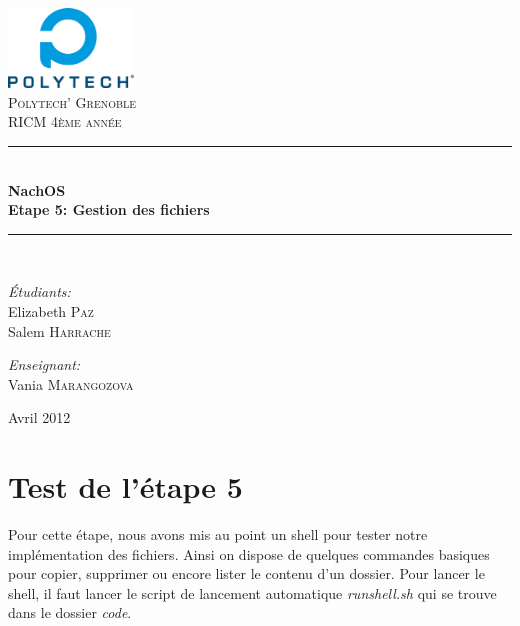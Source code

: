 \documentclass[a4paper,10pt]{article}
\newcommand{\HRule}{\rule{\linewidth}{0.6mm}}
\begin{document}
\begin{titlepage}

\begin{center}


\includegraphics[width=0.25\textwidth]{../images/logo}\\[1cm]

\textsc{\LARGE Polytech' Grenoble}\\[1.5cm]

\textsc{\Large RICM 4\`eme ann\'ee}\\[1.2cm]


\HRule \\[0.4cm]
{ \huge \bfseries NachOS\\[0.6cm]
Etape 5: Gestion des fichiers}
\\[0.4cm]

\HRule \\[2cm]

\begin{minipage}{0.4\textwidth}
\begin{flushleft} \large
\emph{\'Etudiants:}\\
Elizabeth \textsc{Paz} \\
Salem \textsc{Harrache}
\end{flushleft}
\end{minipage}
\begin{minipage}{0.4\textwidth}
\begin{flushright} \large
\emph{Enseignant:} \\
Vania \textsc{Marangozova}
\end{flushright}
\end{minipage}

\vfill

{\large  Avril 2012}

\end{center}

\end{titlepage}

\section{Test de l'étape 5}

Pour cette étape, nous avons mis au point un shell pour tester notre
implémentation des fichiers. Ainsi on dispose de quelques commandes basiques
pour copier, supprimer ou encore lister le contenu d'un dossier. Pour lancer le
shell, il faut lancer le script de lancement automatique \textit{runshell.sh}
qui se trouve dans le dossier \textit{code}.
\end{document}
